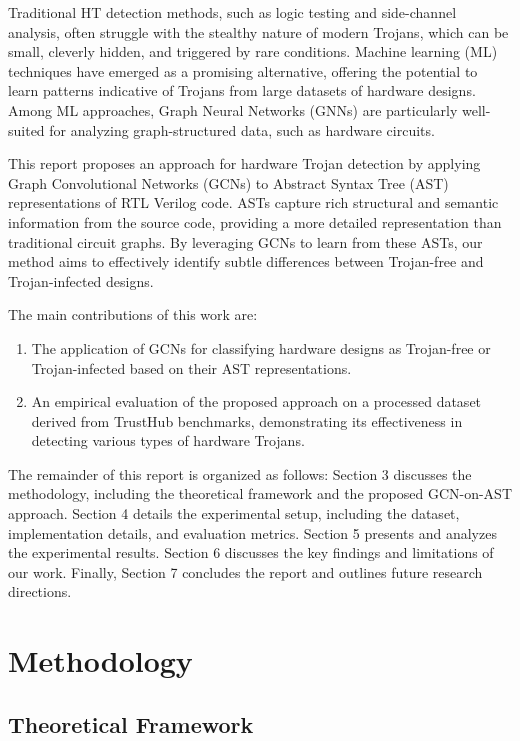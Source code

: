 \documentclass[sigplan,screen]{acmart}
\begin{document}
Traditional HT detection methods, such as logic testing and side-channel analysis, often struggle with the stealthy nature of modern Trojans, which can be small, cleverly hidden, and triggered by rare conditions. Machine learning (ML) techniques have emerged as a promising alternative, offering the potential to learn patterns indicative of Trojans from large datasets of hardware designs. Among ML approaches, Graph Neural Networks (GNNs) are particularly well-suited for analyzing graph-structured data, such as hardware circuits.

This report proposes an approach for hardware Trojan detection by applying Graph Convolutional Networks (GCNs) to Abstract Syntax Tree (AST) representations of RTL Verilog code. ASTs capture rich structural and semantic information from the source code, providing a more detailed representation than traditional circuit graphs. By leveraging GCNs to learn from these ASTs, our method aims to effectively identify subtle differences between Trojan-free and Trojan-infected designs.

The main contributions of this work are:
\begin{enumerate}
    \item The application of GCNs for classifying hardware designs as Trojan-free or Trojan-infected based on their AST representations.
    \item An empirical evaluation of the proposed approach on a processed dataset derived from TrustHub benchmarks, demonstrating its effectiveness in detecting various types of hardware Trojans.
\end{enumerate}

The remainder of this report is organized as follows: Section 3 discusses the methodology, including the theoretical framework and the proposed GCN-on-AST approach. Section 4 details the experimental setup, including the dataset, implementation details, and evaluation metrics. Section 5 presents and analyzes the experimental results. Section 6 discusses the key findings and limitations of our work. Finally, Section 7 concludes the report and outlines future research directions.

\section{Methodology}
\subsection{Theoretical Framework}
\end{document}
